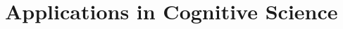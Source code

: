 \documentclass[11pt,a4paper,openany]{book}
\begin{document}
\frontmatter\tableofcontents
\mainmatter
\chapter{Applications in Cognitive Science}
\end{document}
